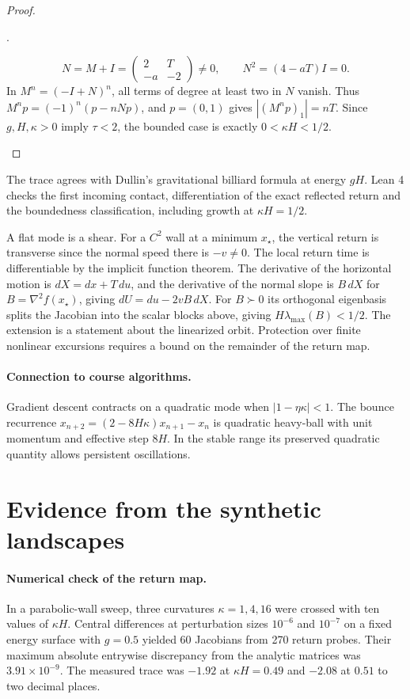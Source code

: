\documentclass[10pt,letterpaper]{article}
\newenvironment{proofsteps}{%
  \setlength{\abovedisplayskip}{4pt}%
  \setlength{\belowdisplayskip}{4pt}%
  \setlength{\abovedisplayshortskip}{3pt}%
  \setlength{\belowdisplayshortskip}{3pt}%
  \begin{list}{\arabic{enumi}.}{\usecounter{enumi}%
    \setlength{\leftmargin}{1.45em}\setlength{\labelsep}{0.4em}%
    \setlength{\topsep}{2pt}\setlength{\itemsep}{2pt}%
    \setlength{\parsep}{0pt}\setlength{\partopsep}{0pt}}%
}{\end{list}}
\begin{document}
\begin{proof}
\begin{proofsteps}
\[
N=M+I=\begin{pmatrix}2&T\\-a&-2\end{pmatrix}\ne0,\qquad
N^2=(4-aT)I=0.
\]
In \(M^n=(-I+N)^n\), all terms of degree at least two in \(N\) vanish. Thus \(M^np=(-1)^n(p-nNp)\), and \(p=(0,1)\) gives \(|(M^np)_1|=nT\). Since \(g,H,\kappa>0\) imply \(\tau<2\), the bounded case is exactly \(0<\kappa H<1/2\). \qedhere
\end{proofsteps}
\end{proof}

The trace agrees with Dullin's gravitational billiard formula \cite[Sec.~5]{dullin} at energy \(gH\). Lean 4 checks the first incoming contact, differentiation of the exact reflected return and the boundedness classification, including growth at \(\kappa H=1/2\).

A flat mode is a shear. For a \(C^2\) wall at a minimum \(x_\star\), the vertical return is transverse since the normal speed there is \(-v\ne0\). The local return time is differentiable by the implicit function theorem. The derivative of the horizontal motion is \(dX=dx+T\,du\), and the derivative of the normal slope is \(B\,dX\) for \(B=\nabla^2f(x_\star)\), giving \(dU=du-2vB\,dX\). For \(B\succ0\) its orthogonal eigenbasis splits the Jacobian into the scalar blocks above, giving \(H\lambda_{\max}(B)<1/2\). The extension is a statement about the linearized orbit. Protection over finite nonlinear excursions requires a bound on the remainder of the return map.

\paragraph{Connection to course algorithms.}
Gradient descent contracts on a quadratic mode when \(|1-\eta\kappa|<1\). The bounce recurrence \(x_{n+2}=(2-8H\kappa)x_{n+1}-x_n\) is quadratic heavy-ball with unit momentum and effective step \(8H\). In the stable range its preserved quadratic quantity allows persistent oscillations.

\clearpage
\section{Evidence from the synthetic landscapes}

\paragraph{Numerical check of the return map.}
In a parabolic-wall sweep, three curvatures \(\kappa=1,4,16\) were crossed with ten values of \(\kappa H\). Central differences at perturbation sizes \(10^{-6}\) and \(10^{-7}\) on a fixed energy surface with \(g=0.5\) yielded 60 Jacobians from 270 return probes. Their maximum absolute entrywise discrepancy from the analytic matrices was \(3.91\times10^{-9}\). The measured trace was \(-1.92\) at \(\kappa H=0.49\) and \(-2.08\) at \(0.51\) to two decimal places.
\end{document}
